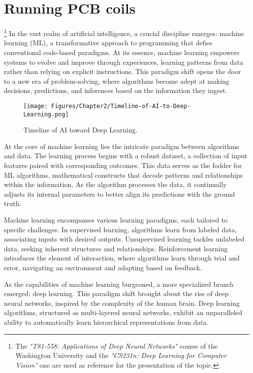 \newpage
\section{Running PCB coils}\footnote{The \textit{"T81-558: Applications of Deep Neural Networks"} course of the Washington University \cite{T81-558} and the \textit{"CS231n: Deep Learning for Computer Vision"}\cite{CS231n} one are used as reference for the presentation of the topic.}
In the vast realm of artificial intelligence, a crucial discipline emerges: machine learning (ML), a transformative approach to programming that defies conventional code-based paradigms. At its essence, machine learning empowers systems to evolve and improve through experiences, learning patterns from data rather than relying on explicit instructions. This paradigm shift opens the door to a new era of problem-solving, where algorithms become adept at making decisions, predictions, and inferences based on the information they ingest.

\begin{figure}[th]
    \centering
    \texttt{[image: Figures/Chapter2/Timeline-of-AI-to-Deep-Learning.png]}
    \caption[Timeline of AI to Deep Learning.]{Timeline of AI toward Deep Learning.}
    \label{fig:TimelineAI}
\end{figure}

At the core of machine learning lies the intricate paradigm between algorithms and data. The learning process begins with a robust dataset, a collection of input features paired with corresponding outcomes. This data serves as the fodder for ML algorithms, mathematical constructs that decode patterns and relationships within the information. As the algorithm processes the data, it continually adjusts its internal parameters to better align its predictions with the ground truth.

Machine learning encompasses various learning paradigms, each tailored to specific challenges. In supervised learning, algorithms learn from labeled data, associating inputs with desired outputs. Unsupervised learning tackles unlabeled data, seeking inherent structures and relationships. Reinforcement learning introduces the element of interaction, where algorithms learn through trial and error, navigating an environment and adapting based on feedback.

As the capabilities of machine learning burgeoned, a more specialized branch emerged: deep learning. This paradigm shift brought about the rise of deep neural networks, inspired by the complexity of the human brain. Deep learning algorithms, structured as multi-layered neural networks, exhibit an unparalleled ability to automatically learn hierarchical representations from data.


